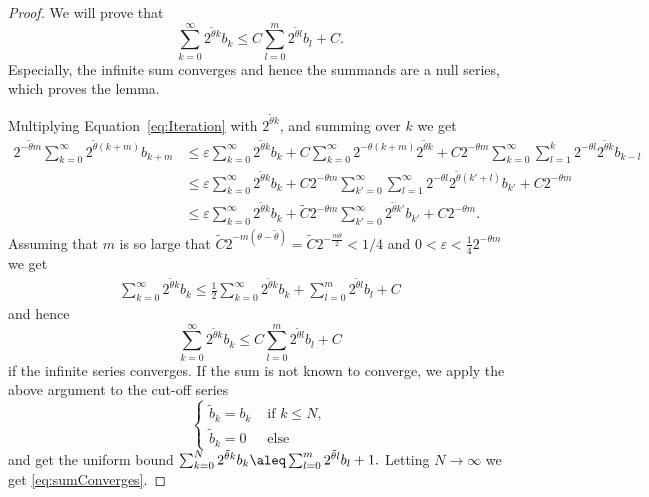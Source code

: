 \begin{proof}
 We will prove that
 \begin{equation} \label{eq:sumConverges}
   \sum_{k=0}^\infty 2^{\tilde \theta k} b_k \leq C\sum_{l=0}^m 2^{\tilde \theta l} b_l+ C.
 \end{equation}
 Especially, the infinite sum converges and hence the summands
 are a null series, which proves the lemma.

  Multiplying Equation~\eqref{eq:Iteration} with $2^{\tilde \theta k}$,
  and summing over $k$ we get 
 \begin{align*}
    2^{-\tilde \theta m} \sum_{k=0}^\infty {2}^{\tilde \theta (k+m)} b_{k+m}
     &\leq \varepsilon \sum_{k=0}^\infty 2^{\tilde \theta k} b_{k} 
     + C \sum_{k=0}^\infty 2^{-\theta (k+m)} 2^{\tilde \theta k} 
     + C 2^{-\theta m}\sum_{k=0}^\infty \sum_{l=1}^k 2^{-\theta l} 2^{\tilde \theta k} b_{k-l}\\
     &\leq \varepsilon \sum_{k=0}^\infty  2^{\tilde \theta k} b_{k}
     + C 2^{-\theta m} \sum_{k'=0}^\infty \sum_{l=1}^\infty 2^{-\theta l} 2^{\tilde \theta (k'+l)} b_{k'} 
     + C 2^{-\theta m} \\
     &\leq \varepsilon \sum_{k=0}^\infty 2^{\tilde \theta k} b_{k}
     + \tilde C 2^{-\theta m} \sum_{k'=0}^\infty 2^{\tilde \theta k'} b_{k'}
     + C 2^{-\theta m}.
 \end{align*}
  Assuming that $m$ is so large that
  $\tilde C 2^{-m(\theta  -\tilde \theta)} = \tilde C 2^{-\frac{m\theta}2} < 1/4$ and $0<\varepsilon<\frac 1 {4} 2^{-\theta m}$
  we get
 \begin{align*}
   \sum_{k=0}^\infty 2^{\tilde \theta k} b_k 
  \leq \frac 1 2 \sum_{k=0}^\infty 2^{\tilde \theta k} b_k  + \sum_{l=0}^m  2^{\tilde \theta l} b_l+ C
 \end{align*}
 and hence
 \begin{equation*}
  \sum_{k=0}^\infty 2^{\tilde \theta k} b_k \leq C \sum_{l=0}^m 2^{\tilde \theta l}b_l + C
 \end{equation*}
 if the infinite series converges. 
 If the sum is not known to converge, we apply the above argument to the cut-off series
 \begin{equation*}
  \begin{cases}
   \tilde b_k =b_k &\text{ if } k \le N, \\
   \tilde b_k = 0 &\text{ else}
  \end{cases}
 \end{equation*}
 and get the uniform bound
 $
  \sum_{k=0}^N  2^{\tilde \theta k} b_k \aleq \sum_{l=0}^m 2^{\tilde\theta l} b_l+ 1.
 $
  Letting $N \rightarrow \infty$ we get \eqref{eq:sumConverges}.
\end{proof}